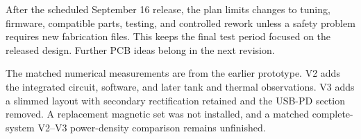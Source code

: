 After the scheduled September 16 release, the plan limits changes to tuning, firmware, compatible parts, testing, and controlled rework unless a safety problem requires new fabrication files. This keeps the final test period focused on the released design. Further PCB ideas belong in the next revision.

The matched numerical measurements are from the earlier prototype. V2 adds the integrated circuit, software, and later tank and thermal observations. V3 adds a slimmed layout with secondary rectification retained and the USB-PD section removed. A replacement magnetic set was not installed, and a matched complete-system V2--V3 power-density comparison remains unfinished.